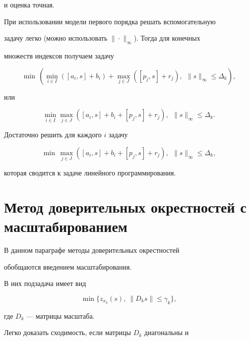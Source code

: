 и оценка точная.





При использовании модели первого порядка решать вспомогательную


задачу легко (можно использовать $\|\cdot\|_{\infty}$). Тогда для конечных


множеств индексов получаем задачу


$$


\min \,( \min_{i \in I} ([a_i,s] +


b_i) + \max_{j \in J} ([p_j,s] + r_j),


\ \ \|s\|_{\infty} \leq \Delta_k),


$$


или


$$


\min_{i \in I} \max_{j \in J} ([a_i,s] + b_i +[p_j,s] + r_j),


\ \ \|s\|_{\infty} \leq \Delta_k.


$$


Достаточно решить для каждого $i$ задачу


$$


\min \, \max_{j \in J} ([a_i,s] + b_i + [p_j,s] + r_j),


\ \ \|s\|_{\infty} \leq \Delta_k,


$$


которая сводится к задаче линейного программирования.








\section{Метод доверительных окрестностей с масштабированием}





В данном параграфе методы доверительных окрестностей


обобщаются введением масштабирования.


В них подзадача имеет вид


$$


\min\{z_{x_{k}} (s), \ \|D_k s \| \leq \gamma_k\},


$$


где $D_k$ --- матрицы масштаба.


Легко доказать сходимость, если матрицы $D_k$ диагональны и


